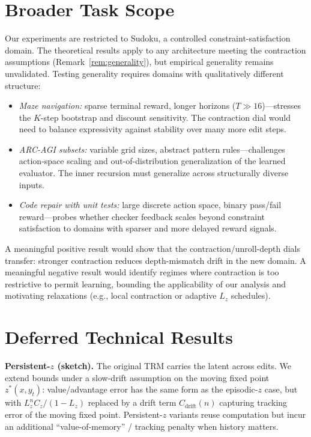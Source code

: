\documentclass{article}
\theoremstyle{plain}
\theoremstyle{definition}
\theoremstyle{remark}
\newcommand{\shortonly}[1]{#1}
\newcommand{\shortonly}[1]{}
\begin{document}
\section{Broader Task Scope}
\label{app:broader_scope}

Our experiments are restricted to Sudoku, a controlled constraint-satisfaction domain.
The theoretical results apply to any architecture meeting the contraction assumptions (Remark~\ref{rem:generality}), but empirical generality remains unvalidated.
Testing generality requires domains with qualitatively different structure:
\begin{itemize}[nosep,leftmargin=*]
\item \emph{Maze navigation:} sparse terminal reward, longer horizons ($T \gg 16$)---stresses the $K$-step bootstrap and discount sensitivity. The contraction dial would need to balance expressivity against stability over many more edit steps.
\item \emph{ARC-AGI subsets:} variable grid sizes, abstract pattern rules---challenges action-space scaling and out-of-distribution generalization of the learned evaluator. The inner recursion must generalize across structurally diverse inputs.
\item \emph{Code repair with unit tests:} large discrete action space, binary pass/fail reward---probes whether checker feedback scales beyond constraint satisfaction to domains with sparser and more delayed reward signals.
\end{itemize}
A meaningful positive result would show that the contraction/unroll-depth dials transfer: stronger contraction reduces depth-mismatch drift in the new domain.
A meaningful negative result would identify regimes where contraction is too restrictive to permit learning, bounding the applicability of our analysis and motivating relaxations (e.g., local contraction or adaptive $L_z$ schedules).

\shortonly{
\section{Deferred Technical Results}
\label{app:deferred}

\textbf{Persistent-$z$ (sketch).}
The original TRM carries the latent across edits.
We extend bounds under a slow-drift assumption on the moving fixed point $z^*(x,y_t)$: value/advantage error has the same form as the episodic-$z$ case, but with $L_z^n C_z/(1{-}L_z)$ replaced by a drift term $C_{\mathrm{drift}}(n)$ capturing tracking error of the moving fixed point.
Persistent-$z$ variants reuse computation but incur an additional ``value-of-memory'' / tracking penalty when history matters.
}
\end{document}
